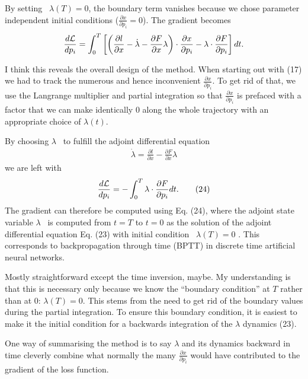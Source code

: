 \documentclass[a4paper]{article}
\newcommand{\blue}[1]{{\color{blue}#1}}
\begin{document}
\blue{
  By setting  $\lambda(T) = 0$, the boundary term vanishes because we
  chose parameter independent initial conditions ($\frac{\partial
    x}{\partial p_i} = 0$). The gradient becomes
  \begin{align}
    \frac{d \cal L}{d p_i} = \int_0^T \left[\left( \frac{\partial
        l}{\partial x} - \dot{\lambda} - \frac{\partial F}{\partial x}
      \lambda \right) \cdot \frac{\partial x}{\partial p_i} - \lambda
      \cdot \frac{\partial F}{\partial p_i} \right] dt .
  \end{align}
}

I think this reveals the overall design of the method. When
starting out with \blue{(17)} we had to track the numerous and hence
inconvenient $\frac{\partial x}{\partial p_i}$. To get rid of that, we
use the Langrange multiplier and partial integration so that
$\frac{\partial x}{\partial p_i}$ is prefaced with a factor that we
can make identically $0$ along the whole trajectory with an
appropriate choice of $\lambda(t)$.

\blue{
  By choosing $\lambda$  to fulfill the adjoint differential equation
  \begin{align}
    \dot{\lambda} = \frac{\partial l}{\partial x} - \frac{\partial
      F}{\partial x} \lambda \tag{23} 
  \end{align}
  we are left with
  \begin{align}
    \frac{d \cal L}{d p_i} = - \int_0^T \lambda \cdot \frac{\partial
      F}{\partial p_i} dt . \tag{24}
  \end{align}
  The gradient can therefore be computed using Eq. (24), where the
  adjoint state variable $\lambda $  is computed from
$t = T$ to $t = 0$ as the solution of the adjoint differential equation Eq. (23) with initial condition  $\lambda(T) = 0$ . This
corresponds to backpropagation through time (BPTT) in discrete time artificial neural networks.
}

Mostly straightforward except the time inversion, maybe. My
understanding is that this is necessary only because we know the
``boundary condition'' at $T$ rather than at $0$: $\lambda (T) =
0$. This stems from the need to get rid of the boundary values during
the partial integration. To ensure this boundary condition, it is
easiest to make it the initial condition for a backwards integration
of the $\lambda$ dynamics \blue{(23)}.  

One way of summarising the method is to say $\lambda$ and its dynamics
backward in time cleverly combine what normally the many
$\frac{\partial x}{\partial p_i}$ would have contributed to the
gradient of the loss function.
\end{document}
